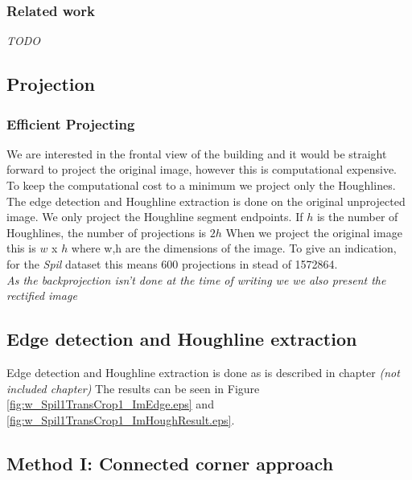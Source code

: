 \subsubsection{Related work}
\emph{TODO}


\subsection{Projection}

\subsubsection{Efficient Projecting} 
We are interested in the frontal view of the building and it would be straight
forward to project the original image, however this is computational
expensive. To keep the computational cost to a minimum we project only the
Houghlines. The edge detection and Houghline extraction is done on the original
unprojected image. We only project the Houghline segment
endpoints. If $h$ is the number of Houghlines, the number of projections is $2h$
When we project the original image this is $w$ x $h$ where w,h are the dimensions of
the image. To give an indication, for the \emph{Spil} dataset %
this means 600 projections in stead of 1572864.\\
\emph{As the backprojection isn't done at the time of writing we 
we also present the rectified image}


\subsection{Edge detection and Houghline extraction}
Edge detection and Houghline extraction is done as is described in chapter 
\emph{(not included chapter)} %
The results can be seen in Figure \ref{fig:w_Spil1TransCrop1_ImEdge.eps} and
\ref{fig:w_Spil1TransCrop1_ImHoughResult.eps}.


\subsection{Method I: Connected corner approach} 

